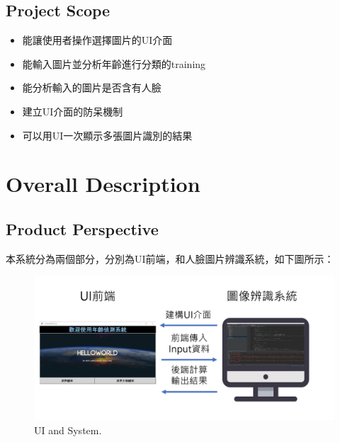 \documentclass{scrreprt}
\begin{document}
\begin{CJK}{UTF8}{bkai}
\section{Project Scope}
    \begin{itemize}
        \item 能讓使用者操作選擇圖片的UI介面
        \item 能輸入圖片並分析年齡進行分類的training
        \item 能分析輸入的圖片是否含有人臉
        \item 建立UI介面的防呆機制
        \item 可以用UI一次顯示多張圖片識別的結果
    \end{itemize}


\chapter{Overall Description}

\section{Product Perspective}
本系統分為兩個部分，分別為UI前端，和人臉圖片辨識系統，如下圖所示：\\
    \begin{figure}[htb]
        \begin{center}
            \includegraphics[scale=0.4]{image/UIandSystem.jpg}%
        \end{center}
        \caption{UI and System.}
        \label{fig:1}
    \end{figure}
\vspace{5.0cm}

\end{CJK}
\end{document}
